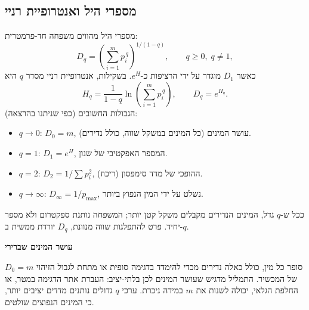 \subsection*{מספרי היל ואנטרופיית רניי}
מספרי היל מהווים משפחה חד-פרמטרית:
\begin{equation}\label{eq:he-bio-hill}
D_q=\left(\sum_{i=1}^{m}p_i^{\,q}\right)^{\!1/(1-q)},\qquad q\ge 0,\; q\neq 1,
\end{equation}
כאשר \(D_1\) מוגדר על ידי הרציפות כ-\(e^{H}\). בשקילות, אנטרופיית רניי מסדר \(q\) היא
\begin{equation}\label{eq:he-bio-renyi}
H_q=\frac{1}{1-q}\ln\!\left(\sum_{i=1}^{m}p_i^{\,q}\right),
\qquad D_q=e^{H_q}.
\end{equation}
הגבולות החשובים (כפי שניתנו בהרצאה):
\begin{itemize}
\item \(q\to 0\): \(D_0=m\), עושר המינים (כל המינים במשקל שווה, כולל נדירים).
\item \(q=1\): \(D_1=e^{H}\), המספר האפקטיבי של שנון.
\item \(q=2\): \(D_2=1/\sum p_i^2\), ההופכי של מדד סימפסון (ריכוז).
\item \(q\to\infty\): \(D_\infty=1/p_{\max}\), נשלט על ידי המין הנפוץ ביותר.
\end{itemize}
ככל ש-\(q\) גדל, המינים הנדירים מקבלים משקל קטן יותר; המשפחה נותנת ספקטרום ולא מספר יחיד. פרט להתפלגות שווה מנוונת, \(D_q\) יורדת ממשית ב-\(q\).
\begin{remark}
\textbf{עושר המינים שברירי}\par
\(D_0=m\) סופר כל מין, כולל כאלה נדירים מכדי להימדד בדגימה סופית או מתחת לגבול הזיהוי של המכשיר. התמליל מדגיש שעושר המינים לכן בלתי-יציב: העברת אתר הדגימה במטר, או החלפת הגלאי, יכולה לשנות את \(m\) במידה ניכרת. ערכי \(q\) גדולים נותנים מדדים יציבים יותר, כי המינים הנפוצים שולטים.
\end{remark}


